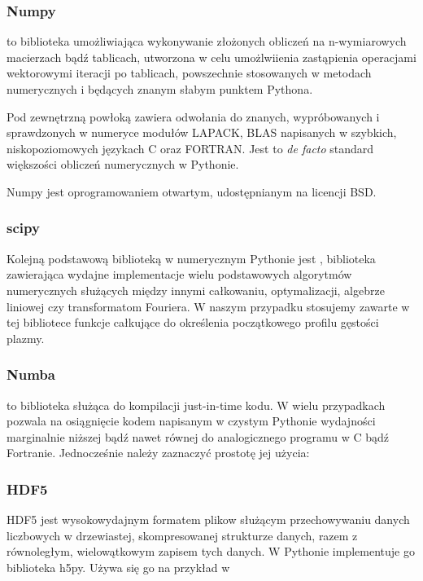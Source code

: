     \subsubsection{Numpy}
     to biblioteka umożliwiająca wykonywanie złożonych obliczeń na n-wymiarowych macierzach
    bądź tablicach, utworzona w celu umożlwiienia zastąpienia operacjami wektorowymi iteracji po tablicach,
    powszechnie stosowanych w metodach numerycznych i będących znanym słabym punktem Pythona.

    Pod zewnętrzną powłoką zawiera odwołania do
    znanych, wypróbowanych i sprawdzonych w numeryce modułów LAPACK, BLAS
    napisanych w szybkich, niskopoziomowych językach C oraz FORTRAN.
    Jest to \emph{de facto}
    standard większości obliczeń numerycznych w Pythonie.

    Numpy jest oprogramowaniem otwartym, udostępnianym na licencji BSD. 

    \subsubsection{scipy}
    Kolejną podstawową biblioteką w numerycznym Pythonie jest , biblioteka
    zawierająca wydajne implementacje wielu podstawowych algorytmów numerycznych służących
    między innymi całkowaniu, optymalizacji, algebrze liniowej czy transformatom Fouriera.
    W naszym przypadku stosujemy zawarte w tej bibliotece funkcje całkujące do określenia
    początkowego profilu gęstości plazmy.

    \subsubsection{Numba}
     to biblioteka służąca do kompilacji just-in-time kodu.
    W wielu przypadkach
    pozwala na osiągnięcie kodem napisanym w czystym Pythonie wydajności marginalnie
    niższej bądź nawet równej do analogicznego programu w C bądź Fortranie. 
    Jednocześnie należy zaznaczyć prostotę jej użycia:



    \subsubsection{HDF5}
    HDF5 jest wysokowydajnym formatem plikow służącym przechowywaniu danych liczbowych w drzewiastej,
    skompresowanej strukturze danych, razem z równoległym, wielowątkowym zapisem tych danych.
    W Pythonie implementuje go biblioteka h5py. 
    Używa się go na przykład w 

